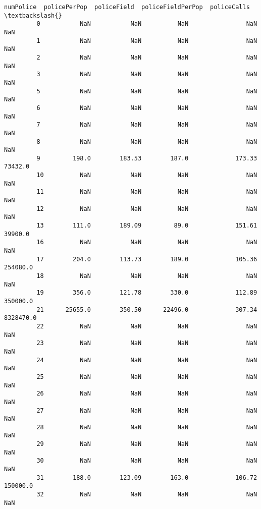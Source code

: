 \documentclass[11pt]{llncs}
\begin{document}
\begin{Verbatim}[commandchars=\\\{\}]
               numPolice  policePerPop  policeField  policeFieldPerPop  policeCalls  \textbackslash{}
         0           NaN           NaN          NaN                NaN          NaN   
         1           NaN           NaN          NaN                NaN          NaN   
         2           NaN           NaN          NaN                NaN          NaN   
         3           NaN           NaN          NaN                NaN          NaN   
         5           NaN           NaN          NaN                NaN          NaN   
         6           NaN           NaN          NaN                NaN          NaN   
         7           NaN           NaN          NaN                NaN          NaN   
         8           NaN           NaN          NaN                NaN          NaN   
         9         198.0        183.53        187.0             173.33      73432.0   
         10          NaN           NaN          NaN                NaN          NaN   
         11          NaN           NaN          NaN                NaN          NaN   
         12          NaN           NaN          NaN                NaN          NaN   
         13        111.0        189.09         89.0             151.61      39900.0   
         16          NaN           NaN          NaN                NaN          NaN   
         17        204.0        113.73        189.0             105.36     254080.0   
         18          NaN           NaN          NaN                NaN          NaN   
         19        356.0        121.78        330.0             112.89     350000.0   
         21      25655.0        350.50      22496.0             307.34    8328470.0   
         22          NaN           NaN          NaN                NaN          NaN   
         23          NaN           NaN          NaN                NaN          NaN   
         24          NaN           NaN          NaN                NaN          NaN   
         25          NaN           NaN          NaN                NaN          NaN   
         26          NaN           NaN          NaN                NaN          NaN   
         27          NaN           NaN          NaN                NaN          NaN   
         28          NaN           NaN          NaN                NaN          NaN   
         29          NaN           NaN          NaN                NaN          NaN   
         30          NaN           NaN          NaN                NaN          NaN   
         31        188.0        123.09        163.0             106.72     150000.0   
         32          NaN           NaN          NaN                NaN          NaN   

\end{Verbatim}
\end{document}
